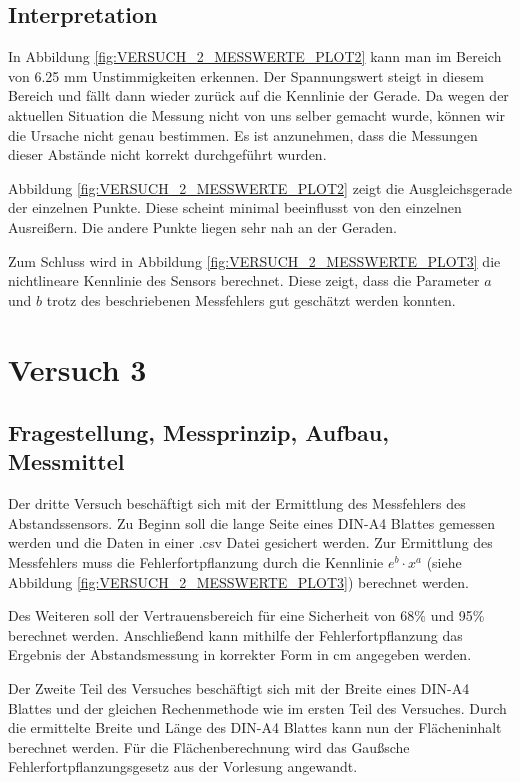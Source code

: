 \documentclass[12pt, oneside, a4paper, \docLanguage]{report}
\begin{document}
\section{Interpretation}
\label{chap:VERSUCH_2_INTERPRETATION}
In Abbildung \ref{fig:VERSUCH_2_MESSWERTE_PLOT2} kann man im Bereich von 6.25 mm Unstimmigkeiten erkennen. Der Spannungswert steigt in diesem Bereich und fällt dann wieder zurück auf die Kennlinie der Gerade. Da wegen der aktuellen Situation die Messung nicht von uns selber gemacht wurde, können wir die Ursache nicht genau bestimmen. Es ist anzunehmen, dass die Messungen dieser Abstände nicht korrekt durchgeführt wurden.

Abbildung \ref{fig:VERSUCH_2_MESSWERTE_PLOT2} zeigt die Ausgleichsgerade der einzelnen Punkte. Diese scheint minimal beeinflusst von den einzelnen Ausreißern. Die andere Punkte liegen sehr nah an der Geraden.

Zum Schluss wird in Abbildung \ref{fig:VERSUCH_2_MESSWERTE_PLOT3} die nichtlineare Kennlinie des Sensors berechnet. Diese zeigt, dass die Parameter \(a\) und \(b\) trotz des beschriebenen Messfehlers gut geschätzt werden konnten.
%
\chapter{Versuch 3}
\label{chap:VERSUCH_3}

\section{Fragestellung, Messprinzip, Aufbau, Messmittel}
\label{chap:VERSUCH_3_FRAGESTELLUNG}
Der dritte Versuch beschäftigt sich mit der Ermittlung des Messfehlers des Abstandssensors. Zu Beginn soll die lange Seite eines DIN-A4 Blattes gemessen werden und die Daten in einer .csv Datei gesichert werden. Zur Ermittlung des Messfehlers muss die Fehlerfortpflanzung durch die Kennlinie $e^b \cdot x^a$ (siehe Abbildung \ref{fig:VERSUCH_2_MESSWERTE_PLOT3}) berechnet werden.

Des Weiteren soll der Vertrauensbereich für eine Sicherheit von 68\% und 95\% berechnet werden. Anschließend kann mithilfe der Fehlerfortpflanzung das Ergebnis der Abstandsmessung in korrekter Form in cm angegeben werden. 

Der Zweite Teil des Versuches beschäftigt sich mit der Breite eines DIN-A4 Blattes und der gleichen Rechenmethode wie im ersten Teil des Versuches. Durch die ermittelte Breite und Länge des DIN-A4 Blattes kann nun der Flächeninhalt berechnet werden. Für die Flächenberechnung wird das Gaußsche Fehlerfortpflanzungsgesetz aus der Vorlesung angewandt. 
\newpage
\end{document}
